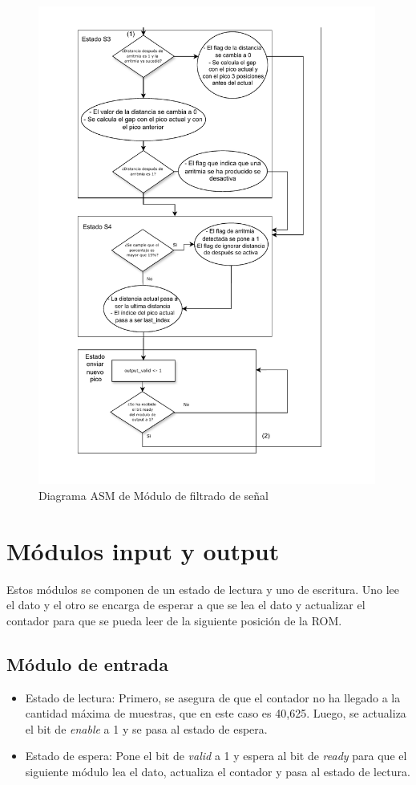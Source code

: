 \begin{figure}[h!]
    \centering
    \includegraphics[width=0.99\textwidth]{./Images/img_implementacion_hw/Diagramaasmarritmias2.pdf}
    \caption{Diagrama ASM de Módulo de filtrado de señal}
    \label{fig:Diagramaasmarritmias2}
\end{figure} 
\FloatBarrier
\section{Módulos input y output}
Estos módulos se componen de un estado de lectura y uno de escritura. Uno lee el dato y el otro se encarga de esperar a que se lea el dato y actualizar el contador para que se pueda leer de la siguiente posición de la ROM.

\subsection{Módulo de entrada}
\begin{itemize}
\item Estado de lectura: Primero, se asegura de que el contador no ha llegado a la cantidad máxima de muestras, que en este caso es 40,625. Luego, se actualiza el bit de \textit{enable} a 1 y se pasa al estado de espera.
\item Estado de espera: Pone el bit de \textit{valid} a 1 y espera al bit de \textit{ready} para que el siguiente módulo lea el dato, actualiza el contador y pasa al estado de lectura.
\end{itemize}

